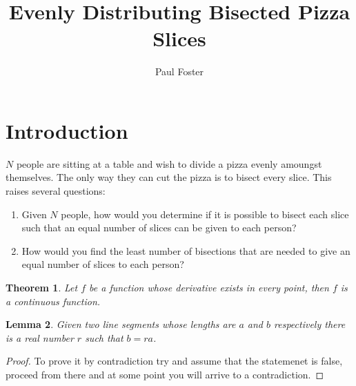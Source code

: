 \documentclass{article}
\title{Evenly Distributing Bisected Pizza Slices}
\author{Paul Foster}
\begin{document}
\maketitle

\newtheorem{theorem}{Theorem}
\newtheorem{corollary}{Corollary}[theorem]
\newtheorem{lemma}[theorem]{Lemma}

\section{Introduction}
$N$ people are sitting at a table and wish to divide a pizza evenly amoungst themselves. The only way they can cut the pizza is to bisect every slice. This raises several questions:

\begin{enumerate}
  \item Given $N$ people, how would you determine if it is possible to bisect each slice such that an equal number of slices can be given to each person?
  \item How would you find the least number of bisections that are needed to give an equal number of slices to each person?
\end{enumerate}

\begin{theorem}
Let $f$ be a function whose derivative exists in every point, then $f$
is a continuous function.
\end{theorem}

\begin{lemma}
Given two line segments whose lengths are $a$ and $b$ respectively there
is a real number $r$ such that $b=ra$.
\end{lemma}

\begin{proof}
To prove it by contradiction try and assume that the statemenet is false,
proceed from there and at some point you will arrive to a contradiction.
\end{proof}
\end{document}

